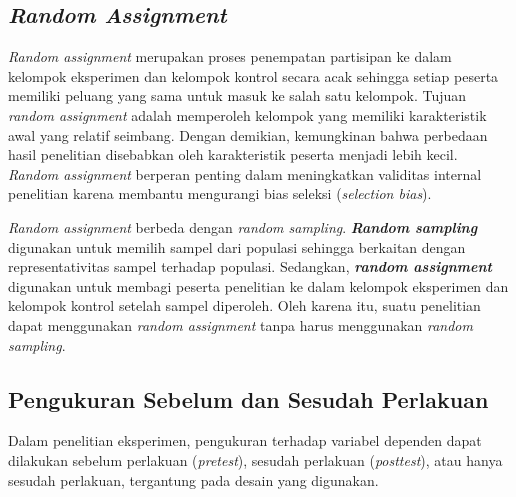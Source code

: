 \documentclass[
  indonesian,
  letterpaper,
  DIV=11,
  numbers=noendperiod]{scrreprt}
\begin{document}
\subsection{\texorpdfstring{\emph{Random
Assignment}}{Random Assignment}}\label{random-assignment}

\emph{Random assignment} merupakan proses penempatan partisipan ke dalam
kelompok eksperimen dan kelompok kontrol secara acak sehingga setiap
peserta memiliki peluang yang sama untuk masuk ke salah satu kelompok.
Tujuan \emph{random assignment} adalah memperoleh kelompok yang memiliki
karakteristik awal yang relatif seimbang. Dengan demikian, kemungkinan
bahwa perbedaan hasil penelitian disebabkan oleh karakteristik peserta
menjadi lebih kecil. \emph{Random assignment} berperan penting dalam
meningkatkan validitas internal penelitian karena membantu mengurangi
bias seleksi (\emph{selection bias}).

\begin{tcolorbox}[enhanced jigsaw, colframe=quarto-callout-caution-color-frame, toptitle=1mm, breakable, leftrule=.75mm, arc=.35mm, toprule=.15mm, colback=white, colbacktitle=quarto-callout-caution-color!10!white, bottomtitle=1mm, bottomrule=.15mm, titlerule=0mm, title=\textcolor{quarto-callout-caution-color}{\faFire}\hspace{0.5em}{\emph{Random assignment} ≠ \emph{Random sampling}}, coltitle=black, left=2mm, opacitybacktitle=0.6, opacityback=0, rightrule=.15mm]

\emph{Random assignment} berbeda dengan \emph{random sampling}.
\textbf{\emph{Random sampling}} digunakan untuk memilih sampel dari
populasi sehingga berkaitan dengan representativitas sampel terhadap
populasi. Sedangkan, \textbf{\emph{random assignment}} digunakan untuk
membagi peserta penelitian ke dalam kelompok eksperimen dan kelompok
kontrol setelah sampel diperoleh. Oleh karena itu, suatu penelitian
dapat menggunakan \emph{random assignment} tanpa harus menggunakan
\emph{random sampling}.

\end{tcolorbox}

\subsection{Pengukuran Sebelum dan Sesudah
Perlakuan}\label{pengukuran-sebelum-dan-sesudah-perlakuan}

Dalam penelitian eksperimen, pengukuran terhadap variabel dependen dapat
dilakukan sebelum perlakuan (\emph{pretest}), sesudah perlakuan
(\emph{posttest}), atau hanya sesudah perlakuan, tergantung pada desain
yang digunakan.
\end{document}
